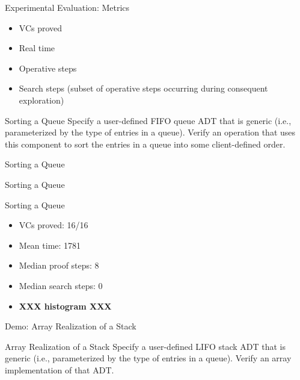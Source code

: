 \begin{frame}{Experimental Evaluation: Metrics}
	\begin{itemize}
		\item VCs proved
		\item Real time
		\item Operative steps
		\item Search steps (subset of operative steps occurring during consequent exploration)
	\end{itemize}
\end{frame}


\begin{frame}{Sorting a Queue}
	Specify a user-defined FIFO queue ADT that is generic (i.e., parameterized by the type of entries in a queue). Verify an operation that uses this component to sort the entries in a queue into some client-defined order.
	\vspace{2em}
	
\end{frame}


\begin{frame}{Sorting a Queue}
	
\end{frame}


\begin{frame}{Sorting a Queue}
	
\end{frame}


\begin{frame}{Sorting a Queue}
	\begin{itemize}
		\item VCs proved: 16/16
		\item Mean time: 1781
		\item Median proof steps: 8
		\item Median search steps: 0
		\item \textbf{XXX histogram XXX}
	\end{itemize}
\end{frame}


\begin{frame}{Demo: Array Realization of a Stack}
~
\end{frame}


\begin{frame}{Array Realization of a Stack}
	Specify a user-defined LIFO stack ADT that is generic (i.e., parameterized by the type of entries in a queue). Verify an array implementation of that ADT.
\end{frame}


